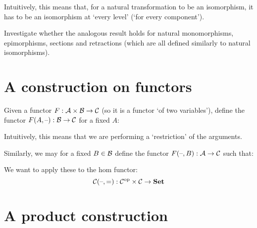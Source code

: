 Intuitively, this means that, for a natural transformation to be an isomorphism,
it has to be an isomorphism at `every level' (`for every component').

\begin{exercise}
Investigate whether the analogous result holds for natural monomorphisms,
epimorphisms, sections and retractions (which are all defined similarly to
natural isomorphisms).
\end{exercise}

\section{A construction on functors}

Given a functor $F: \mathcal{A} \times \mathcal{B} \to \mathcal{C}$ (so it is a functor
`of two variables'), define the functor $F (A, \text{--}): \mathcal{B} \to \mathcal{C}$
for a fixed $A$:

\begin{center}
\end{center}

Intuitively, this means that we are performing a `restriction' of the arguments.

Similarly, we may for a fixed $B \in \mathcal{B}$ define the functor
$F (\text{--}, B) : \mathcal{A} \to \mathcal{C}$ such that:

\begin{center}
\end{center}

We want to apply these to the hom functor:
\[\mathcal{C} (\text{--}, \text{=}): {\mathcal{C}}^{\mathrm{op}} \times \mathcal{C} \to \mathbf {Set}\]

\section{A product construction}



